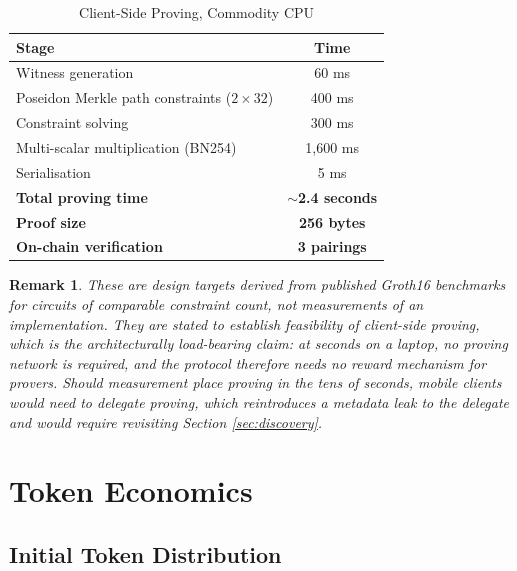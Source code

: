 \documentclass[11pt,a4paper]{article}
\newtheorem{remark}[theorem]{Remark}
\begin{document}
\begin{table}[H]
\centering
\caption{Client-Side Proving, Commodity CPU}
\begin{tabular}{@{}lc@{}}
\toprule
\textbf{Stage} & \textbf{Time} \\ \midrule
Witness generation & 60 ms \\
Poseidon Merkle path constraints ($2 \times 32$) & 400 ms \\
Constraint solving & 300 ms \\
Multi-scalar multiplication (BN254) & 1{,}600 ms \\
Serialisation & 5 ms \\ \midrule
\textbf{Total proving time} & \textbf{$\sim$2.4 seconds} \\
\textbf{Proof size} & \textbf{256 bytes} \\
\textbf{On-chain verification} & \textbf{3 pairings} \\ \bottomrule
\end{tabular}
\end{table}

\begin{remark}
These are design targets derived from published Groth16 benchmarks for circuits of comparable constraint count, not measurements of an implementation. They are stated to establish feasibility of client-side proving, which is the architecturally load-bearing claim: at seconds on a laptop, no proving network is required, and the protocol therefore needs no reward mechanism for provers. Should measurement place proving in the tens of seconds, mobile clients would need to delegate proving, which reintroduces a metadata leak to the delegate and would require revisiting Section \ref{sec:discovery}.
\end{remark}

\section{Token Economics}
\label{sec:economics}

\subsection{Initial Token Distribution}
\end{document}

